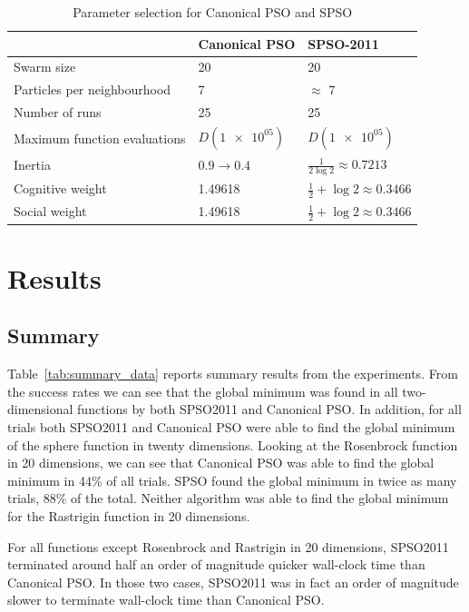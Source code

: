 \documentclass{csfourzero}
\begin{document}
\begin{table}
\centering
  \begin{tabular}{lll}
  \hline
                                & Canonical PSO         & SPSO-2011 \\ \hline
  Swarm size                    & 20                    & 20 \\
  Particles per neighbourhood   & 7                     & $\approx$ 7 \\
  Number of runs                & 25                    & 25 \\
  Maximum function evaluations  & $D(\num{1e+05})$      & $D(\num{1e+05})$ \\
  Inertia                       & $0.9 \rightarrow 0.4$ & $\frac{1}{2\log{2}} \approx 0.7213$ \\
  Cognitive weight              & 1.49618               & $\frac{1}{2} + \log{2} \approx 0.3466$ \\
  Social weight                 & 1.49618               & $\frac{1}{2} + \log{2} \approx 0.3466$ \\
  \end{tabular}
  \caption{Parameter selection for Canonical PSO and SPSO}
  \label{tab:parameters}
\end{table}


\section{Results}

\subsection{Summary}

Table~\ref{tab:summary_data} reports summary results from the experiments. From
the success rates we can see that the global minimum was found in all
two-dimensional functions by both SPSO2011 and Canonical PSO\@. In addition, for
all trials both SPSO2011 and Canonical PSO were able to find the global minimum
of the sphere function in twenty dimensions. Looking at the Rosenbrock function
in 20 dimensions, we can see that Canonical PSO was able to find the global
minimum in 44\% of all trials. SPSO found the global minimum in twice as many
trials, 88\% of the total. Neither algorithm was able to find the global minimum
for the Rastrigin function in 20 dimensions.

For all functions except Rosenbrock and Rastrigin in 20 dimensions, SPSO2011
terminated around half an order of magnitude quicker wall-clock time than
Canonical PSO\@. In those two cases, SPSO2011 was in fact an order of magnitude
slower to terminate wall-clock time than Canonical PSO.
\end{document}
